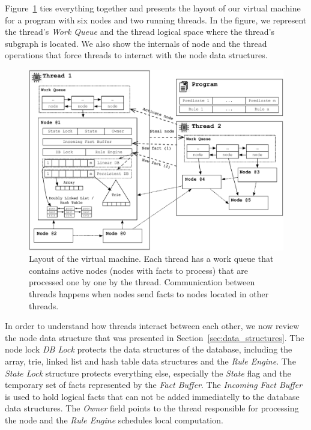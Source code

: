Figure~\ref{fig:implementation:vm_overview} ties everything together and
presents the layout of our virtual machine for a program with six nodes and two
running threads. In the figure, we represent the thread's \emph{Work Queue} and
the thread logical space where the thread's subgraph is located. We also show
the internals of node  and the thread operations that force threads to
interact with the node data structures.

\begin{figure}[t]
\centering
\includegraphics[width=\textwidth]{figures/implementation/vm_overview.pdf}
\caption{Layout of the virtual machine. Each thread has a work queue that
   contains active nodes (nodes with facts to process) that are processed one
   by one by the thread. Communication between threads happens when nodes
   send facts to nodes located in other threads.}
\label{fig:implementation:vm_overview}
\end{figure}

In order to understand how threads interact between each other, we now review
the node data structure that was presented in Section~\ref{sec:data_structures}.
The node lock \emph{DB Lock} protects the data structures of the database,
including the array, trie, linked list and hash table data structures and the
\emph{Rule Engine}. The \emph{State Lock} structure protects everything else,
especially the \emph{State} flag and the temporary set of facts represented by
the \emph{Fact Buffer}. The \emph{Incoming Fact Buffer} is used to hold logical facts
that can not be added immediatelly to the database data structures. The
\emph{Owner} field points to the thread responsible for processing the node and
the \emph{Rule Engine} schedules local computation.

